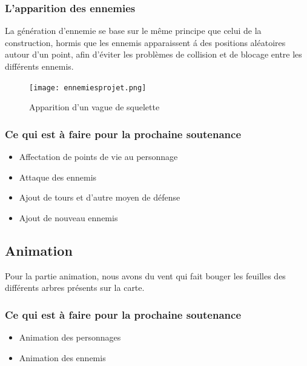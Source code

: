 \documentclass[a4paper, 12pt]{article}
\begin{document}
		
		\subsubsection{L'apparition des ennemies}
	
		La génération d'ennemie se base sur le même principe que celui de la construction, hormis que les ennemis apparaissent \'a des positions aléatoires autour d'un point, afin d'éviter les problèmes de collision et de blocage entre les différents ennemis. \\
	\begin{figure}[!ht]
		\centerline{\texttt{[image: ennemiesprojet.png]}}
		\caption*{Apparition d'un vague de squelette}
	\end{figure}

	\subsubsection*{Ce qui est à faire pour la prochaine soutenance}	
	\begin{itemize}
	\item Affectation de points de vie au personnage
	\item Attaque des ennemis
	\item Ajout de tours et d'autre moyen de d\'efense
	\item Ajout de nouveau ennemis 
	\end{itemize}

	\subsection{Animation}
	Pour la partie animation, nous avons du vent qui fait bouger les feuilles des différents arbres présents sur la carte.

\subsubsection*{Ce qui est à faire pour la prochaine soutenance}
\begin{itemize}
\item Animation des personnages
\item Animation des ennemis
\end{itemize}
\end{document}
